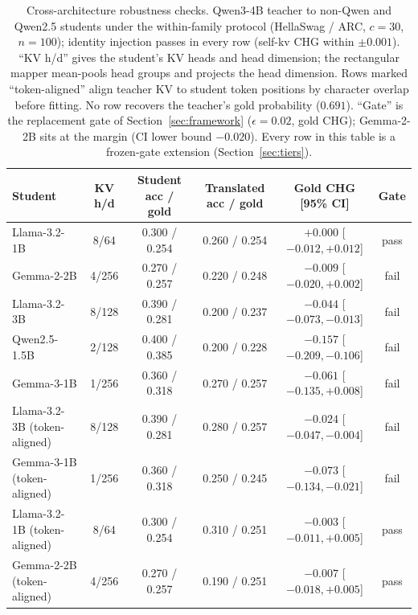 \documentclass{article} %
\begin{document}
\begin{table}[t]
\centering
\caption{Cross-architecture robustness checks. Qwen3-4B teacher to non-Qwen
and Qwen2.5 students under the within-family protocol (HellaSwag / ARC,
$c{=}30$, $n{=}100$); identity injection passes in every row (self-kv CHG
within $\pm0.001$). ``KV h/d'' gives the student's KV heads and head
dimension; the rectangular mapper mean-pools head groups and projects the
head dimension. Rows marked ``token-aligned'' align teacher KV to student token
positions by character overlap before fitting. No row recovers the teacher's
gold probability ($0.691$). ``Gate'' is the replacement gate of
Section~\ref{sec:framework} ($\epsilon{=}0.02$, gold CHG); Gemma-2-2B sits at
the margin (CI lower bound $-0.020$). Every row in this table is a frozen-gate
extension (Section~\ref{sec:tiers}).}
\label{tab:crossarch}
\scriptsize
\setlength{\tabcolsep}{3pt}
\begin{tabular}{lcccc c}
\toprule
Student & KV h/d & Student acc / gold & Translated acc / gold & Gold CHG [95\% CI] & Gate \\
\midrule
Llama-3.2-1B & 8/64 & 0.300 / 0.254 & 0.260 / 0.254 & $+0.000$ [$-0.012, +0.012$] & pass \\
Gemma-2-2B & 4/256 & 0.270 / 0.257 & 0.220 / 0.248 & $-0.009$ [$-0.020, +0.002$] & fail \\
Llama-3.2-3B & 8/128 & 0.390 / 0.281 & 0.200 / 0.237 & $-0.044$ [$-0.073, -0.013$] & fail \\
Qwen2.5-1.5B & 2/128 & 0.400 / 0.385 & 0.200 / 0.228 & $-0.157$ [$-0.209, -0.106$] & fail \\
Gemma-3-1B & 1/256 & 0.360 / 0.318 & 0.270 / 0.257 & $-0.061$ [$-0.135, +0.008$] & fail \\
\midrule
Llama-3.2-3B (token-aligned) & 8/128 & 0.390 / 0.281 & 0.280 / 0.257 & $-0.024$ [$-0.047, -0.004$] & fail \\
Gemma-3-1B (token-aligned) & 1/256 & 0.360 / 0.318 & 0.250 / 0.245 & $-0.073$ [$-0.134, -0.021$] & fail \\
Llama-3.2-1B (token-aligned) & 8/64 & 0.300 / 0.254 & 0.310 / 0.251 & $-0.003$ [$-0.011, +0.005$] & pass \\
Gemma-2-2B (token-aligned) & 4/256 & 0.270 / 0.257 & 0.190 / 0.251 & $-0.007$ [$-0.018, +0.005$] & pass \\
\bottomrule
\end{tabular}
\end{table}
\end{document}
